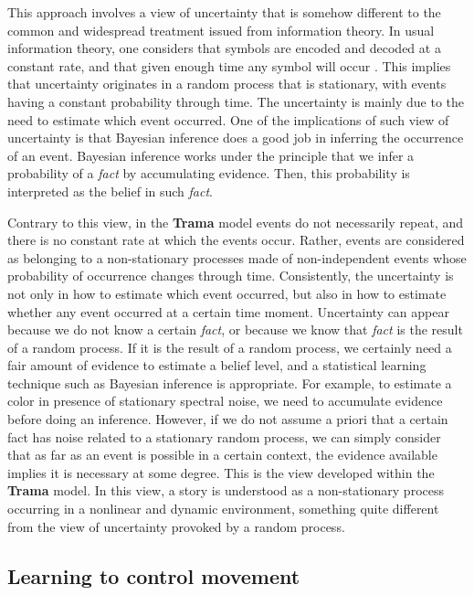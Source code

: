 \documentclass[
		twoside,openright,titlepage,numbers=noenddot,manychapters,
		headinclude,%
                footinclude=false,cleardoublepage=empty,
                BCOR=5mm,
		fontsize=11pt, %
                 enabledeprecatedfontcommands]{scrreprt}
\begin{document}
This approach involves a view of uncertainty that is somehow different to the common and widespread treatment issued from information theory. In usual information theory, one considers that symbols are encoded and decoded at a constant rate, and that given enough time any symbol will occur \cite[]{shannon48}. This implies that uncertainty originates in a random process that is stationary, with events having a constant probability through time. The uncertainty is mainly due to the need to estimate which event occurred. One of the implications of such view of uncertainty is that Bayesian inference does a good job in inferring the occurrence of an event. Bayesian inference works under the principle that we infer a probability of a \emph{fact} by accumulating evidence. Then, this probability is interpreted as the belief in such \emph{fact}. 

Contrary to this view, in the \textbf{Trama} model events do not necessarily repeat, and there is no constant rate at which the events occur. Rather, events are considered as belonging to a  non-stationary processes made of non-independent events whose probability of occurrence changes through time. Consistently, the uncertainty is not only in how to estimate which event occurred, but also in how to estimate whether any event occurred at a certain time moment. Uncertainty can appear because we do not know a certain \emph{fact}, or because we know that \emph{fact} is the result of a random process. If it is the result of a random process, we certainly need a fair amount of evidence to estimate a belief level, and a statistical learning technique such as Bayesian inference is appropriate. For example, to estimate a color in presence of stationary spectral noise, we need to accumulate evidence before doing an inference. However, if we do not assume a priori that a certain fact has noise related to a stationary random process, we can simply consider that as far as an event is possible in a certain context, the evidence available implies it is necessary at some degree. This is the view developed within the \textbf{Trama} model. In this view, a story is understood as a non-stationary process occurring in a nonlinear and dynamic environment, something quite different from the view of uncertainty provoked by a random process.



\subsection{Learning to control movement}
\end{document}
